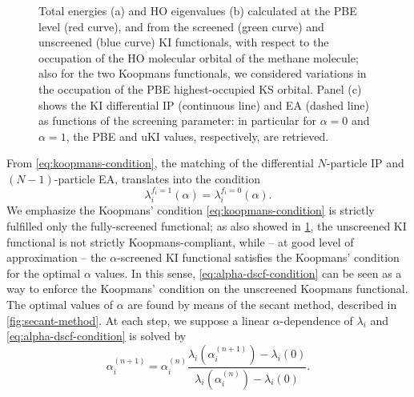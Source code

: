 \begin{figure}
    \centering
    \usebox{\measurebox}
    \begin{minipage}{.48\linewidth}
        \vfill
    \end{minipage}
    \caption[Total energy and $\varepsilon_{\rm HO}$ vs. $f_{\rm HO}$ for $CH_4$ molecule]{Total energies (a) and HO eigenvalues (b) calculated at the PBE level (red curve), and from the screened (green curve) and unscreened (blue curve) KI functionals, with respect to the occupation of the HO molecular orbital of the methane molecule; also for the two Koopmans functionals, we considered variations in the occupation of the PBE highest-occupied KS orbital. Panel (c) shows the KI differential IP (continuous line) and EA (dashed line) as functions of the screening parameter: in particular for $\alpha=0$ and $\alpha=1$, the PBE and uKI values, respectively, are retrieved.}
    \label{fig:pwl-ki-dft}
\end{figure}

From \cref{eq:koopmans-condition}, the matching of the differential $N$-particle IP and $(N-1)$-particle EA, translates into the condition
%
\begin{equation}
    \lambda_i^{f_i=1}(\alpha) = \lambda_i^{f_i=0}(\alpha) .
    \label{eq:alpha-dscf-condition}
\end{equation}
%
We emphasize the Koopmans' condition \eqref{eq:koopmans-condition} is strictly fulfilled only the fully-screened functional; as also showed in \cref{fig:pwl-ki-dft}, the unscreened KI functional is not strictly Koopmans-compliant, while -- at good level of approximation -- the $\alpha$-screened KI functional satisfies the Koopmans' condition for the optimal $\alpha$ values. In this sense, \cref{eq:alpha-dscf-condition} can be seen as a way to enforce the Koopmans' condition on the unscreened Koopmans functional. The optimal values of $\alpha$ are found by means of the secant method, described in \cref{fig:secant-method}. At each step, we suppose a linear $\alpha$-dependence of $\lambda_i$ and \cref{eq:alpha-dscf-condition} is solved by
%
\begin{equation}
    \alpha_i^{(n+1)} = \alpha_i^{(n)} \frac{\lambda_i(\alpha_i^{(n+1)}) - \lambda_i(0)}{\lambda_i(\alpha_i^{(n)}) - \lambda_i(0)} .
    \label{eq:alpha-intermediate-expression}
\end{equation}

